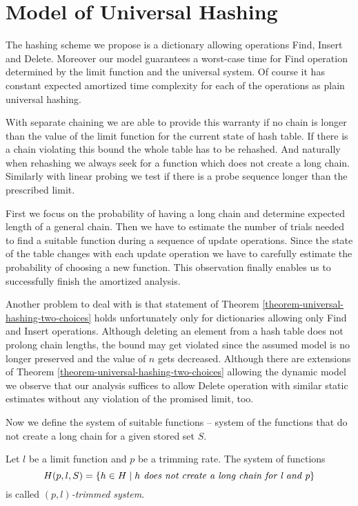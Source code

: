 \section{Model of Universal Hashing}
\label{section-model}
The hashing scheme we propose is a dictionary allowing operations Find, Insert and Delete. Moreover our model guarantees a worst-case time for Find operation determined by the limit function and the universal system. Of course it has constant expected amortized time complexity for each of the operations as plain universal hashing. 

With separate chaining we are able to provide this warranty if no chain is longer than the value of the limit function for the current state of hash table. If there is a chain violating this bound the whole table has to be rehashed. And naturally when rehashing we always seek for a function which does not create a long chain. Similarly with linear probing we test if there is a probe sequence longer than the prescribed limit.

First we focus on the probability of having a long chain and determine expected length of a general chain. Then we have to estimate the number of trials needed to find a suitable function during a sequence of update operations. Since the state of the table changes with each update operation we have to carefully estimate the probability of choosing a new function. This observation finally enables us to successfully finish the amortized analysis.

Another problem to deal with is that statement of Theorem \ref{theorem-universal-hashing-two-choices} holds unfortunately only for dictionaries allowing only Find and Insert operations. Although deleting an element from a hash table does not prolong chain lengths, the bound may get violated since the assumed model is no longer preserved and the value of $n$ gets decreased. Although there are extensions of Theorem \ref{theorem-universal-hashing-two-choices} allowing the dynamic model \cite{DBLP:journals/jacm/Vocking03} we observe that our analysis suffices to allow Delete operation with similar static estimates without any violation of the promised limit, too. 

Now we define the system of suitable functions -- system of the functions that do not create a long chain for a given stored set $S$.
\begin{definition}
Let $l$ be a limit function and $p$ be a trimming rate. The system of functions \[ H(p, l, S) = \{ h \in H \mid h \textit{ does not create a long chain for l and p} \} \] is called \emph{$(p, l)$-trimmed system}.
\end{definition}


